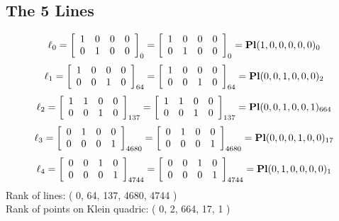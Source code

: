 \documentclass{article}
\begin{document}
{\subsection*{The 5 Lines}
$$
\ell_{0} = 
\left[
\begin{array}{*{4}{r}}
1 & 0 & 0 & 0\\
0 & 1 & 0 & 0\\
\end{array}
\right]
_{0}
=
\left[
\begin{array}{*{4}c}
1  & 0  & 0  & 0\\
0  & 1  & 0  & 0\\
\end{array}
\right]_{0}
={\rm\bf Pl}(1,0,0,0,0,0 )_{0}$$
$$
\ell_{1} = 
\left[
\begin{array}{*{4}{r}}
1 & 0 & 0 & 0\\
0 & 0 & 1 & 0\\
\end{array}
\right]
_{64}
=
\left[
\begin{array}{*{4}c}
1  & 0  & 0  & 0\\
0  & 0  & 1  & 0\\
\end{array}
\right]_{64}
={\rm\bf Pl}(0,0,1,0,0,0 )_{2}$$
$$
\ell_{2} = 
\left[
\begin{array}{*{4}{r}}
1 & 1 & 0 & 0\\
0 & 0 & 1 & 0\\
\end{array}
\right]
_{137}
=
\left[
\begin{array}{*{4}c}
1  & 1  & 0  & 0\\
0  & 0  & 1  & 0\\
\end{array}
\right]_{137}
={\rm\bf Pl}(0,0,1,0,0,1 )_{664}$$
$$
\ell_{3} = 
\left[
\begin{array}{*{4}{r}}
0 & 1 & 0 & 0\\
0 & 0 & 0 & 1\\
\end{array}
\right]
_{4680}
=
\left[
\begin{array}{*{4}c}
0  & 1  & 0  & 0\\
0  & 0  & 0  & 1\\
\end{array}
\right]_{4680}
={\rm\bf Pl}(0,0,0,1,0,0 )_{17}$$
$$
\ell_{4} = 
\left[
\begin{array}{*{4}{r}}
0 & 0 & 1 & 0\\
0 & 0 & 0 & 1\\
\end{array}
\right]
_{4744}
=
\left[
\begin{array}{*{4}c}
0  & 0  & 1  & 0\\
0  & 0  & 0  & 1\\
\end{array}
\right]_{4744}
={\rm\bf Pl}(0,1,0,0,0,0 )_{1}$$
Rank of lines: ( 0, 64, 137, 4680, 4744 )\\
Rank of points on Klein quadric: ( 0, 2, 664, 17, 1 )\\
}
\end{document}
